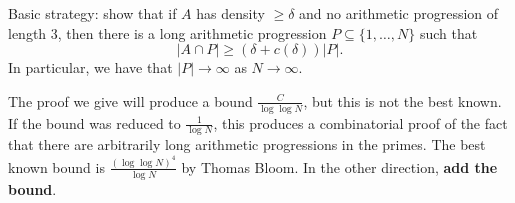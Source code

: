 \documentclass{article}
\newcommand{\1}[1]{\mathbbm{1}_{#1}}
\begin{document}
Basic strategy: show that if $A$ has density $\geq \delta$ and no arithmetic progression of length 3, then there is a long arithmetic progression $P \subseteq \{1, \dotsc, N\}$ such that
\begin{equation*}
  |A \cap P| \geq (\delta + c(\delta)) |P|.
\end{equation*}
In particular, we have that $|P| \to \infty$ as $N \to \infty$.

The proof we give will produce a bound $\frac{C}{\log \log N}$, but this is not the best known.
If the bound was reduced to $\frac{1}{\log N}$, this produces a combinatorial proof of the fact that there are arbitrarily long arithmetic progressions in the primes.
The best known bound is $\frac{(\log \log N)^4}{\log N}$ by Thomas Bloom.
In the other direction, \textbf{add the bound}.
\end{document}
